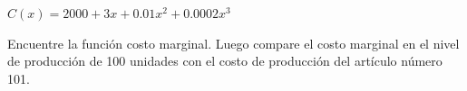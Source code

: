 \item $C(x) = 2000 + 3x + 0.01x^2 + 0.0002x^3$
\par
Encuentre la función costo marginal. Luego compare el costo marginal en el nivel de producción de 100 unidades con el costo de producción del artículo número 101.
